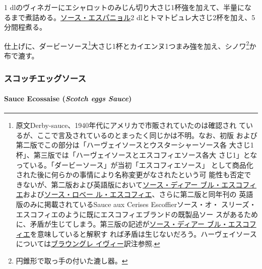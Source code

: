 \begin{recette}
1\undemi{}
dlのヴィネガーにエシャロットのみじん切り大さじ1杯強を加えて、半量になるまで煮詰める。\protect\hyperlink{sauce-espagnole}{ソース・エスパニョル}2\undemi{}
dlとトマトピュレ大さじ2杯を加え、5分間程煮る。

仕上げに、ダービーソース\footnote{原文Derby-sauce、1940年代にアメリカで市販されていたのは確認され
  ているが、ここで言及されているのとまったく同じかは不明。なお、初版
  および第二版でこの部分は「ハーヴェイソースとウスターシャーソース各
  大さじ1杯」、第三版では「ハーヴェイソースとエスコフィエソース各大
  さじ1」となっている。「ダービーソース」が当初「エスコフィエソース」
  として商品化された後に何らかの事情により名称変更がなされたという可
  能性も否定できないが、第二版および英語版において\protect\hyperlink{sauce-diable-escoffier}{ソース・ディアー
  ブル・エスコフィエ}および\protect\hyperlink{sauce-robert-escoffier}{ソース・ロベー
  ル・エスコフィエ}、さらに第二版と同年刊の
  英語版のみに掲載されているSauce aux Cerises Escoffierソース・オ・
  スリーズ・エスコフィエのように既にエスコフィエブランドの既製品ソー
  スがあるために、矛盾が生じてしまう。第三版の記述が\protect\hyperlink{sauce-diable-escoffier}{ソース・ディアー
  ブル・エスコフィエ}を意味していると解釈す
  れば矛盾は生じないだろう。ハーヴェイソースについては\protect\hyperlink{brown-gravy}{ブラウングレ
  イヴィー}訳注参照.}大さじ1杯とカイエンヌ1つまみ強を加え、シノワ\footnote{円錐形で取っ手の付いた漉し器。}か布で漉す。

\maeaki

\hypertarget{ux30b9ux30b3ux30c3ux30c1ux30a8ux30c3ux30b0ux30bdux30fcux30b9}{%
\subsubsection{スコッチエッグソース}\label{ux30b9ux30b3ux30c3ux30c1ux30a8ux30c3ux30b0ux30bdux30fcux30b9}}

\hypertarget{scotch-eggs-sauce}{%
\paragraph{\texorpdfstring{Sauce Ecossaise (\emph{Scotch eggs
Sauce})}{Sauce Ecossaise (Scotch eggs Sauce)}}\label{scotch-eggs-sauce}}



\end{recette}
